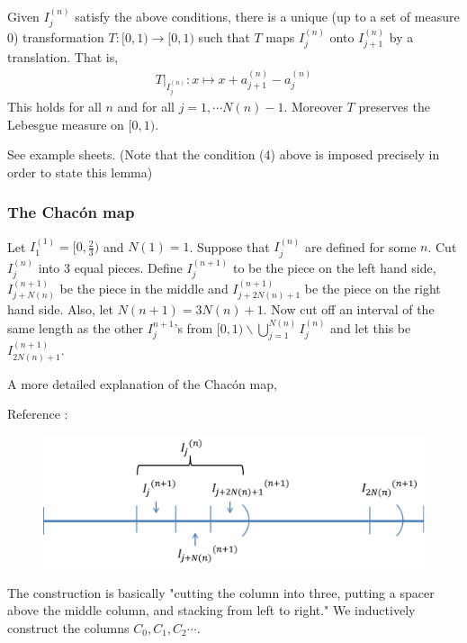\documentclass[12pt,a4paper]{report}
\newenvironment{proof}
{\begin{changemargin}{1cm}{0.5cm} 
	}%
	{\end{changemargin}
}
\begin{document}
\lem Given $I_j^{(n)}$ satisfy the above conditions, there is a unique (up to a set of measure 0) transformation $T: [0,1) \rightarrow [0,1)$ such that $T$ maps $I_j^{(n)}$ onto $I_{j+1}^{(n)}$ by a translation. That is, 
\begin{align*}
T \big|_{I_{j}^{(n)}} : x \mapsto x + a_{j+1}^{(n)} - a_j^{(n)}
\end{align*}
This holds for all $n$ and for all $j=1, \cdots N(n)-1$. Moreover $T$ preserves the Lebesgue measure on $[0,1)$.
\begin{proof}
\pf See example sheets. (Note that the condition (4) above is imposed precisely in order to state this lemma)
\end{proof}
\s

\subsubsection*{The Chac\'{o}n map}

Let $I_1^{(1)} = [0,\frac{2}{3})$ and $N(1) =1$. Suppose that $I_j^{(n)}$ are defined for some $n$. Cut $I_{j}^{(n)}$ into 3 equal pieces. Define $I_j^{(n+1)}$ to be the piece on the left hand side, $I_{j+N(n)}^{(n+1)}$ be the piece in the middle and $I_{j+2N(n)+1}^{(n+1)}$ be the piece on the right hand side. Also, let $N(n+1) = 3N(n)+1$. Now cut off an interval of the same length as the other $I_j^{n+1}$'s from $[0,1) \backslash \bigcup_{j=1}^{N(n)} I_j^{(n)}$ and let this be $I_{2N(n)+1}^{(n+1)}$.
\s

\digression

A more detailed explanation of the Chac\'{o}n map, 

Reference : 
\s

\begin{figure}[h]
	\centering
	\includegraphics[scale=0.4]{1}
\end{figure}

The construction is basically "cutting the column into three, putting a spacer above the middle column, and stacking from left to right." We inductively construct the columns $C_0, C_1, C_2 \cdots$.
\s
\end{document}
